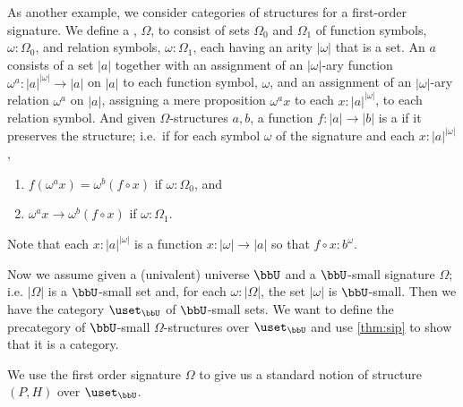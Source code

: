 As another example, we consider categories of structures for a first-order signature.
We define a ,
%
%
$\Omega$, to consist of sets $\Omega_0$ and $\Omega_1$ of function symbols, $\omega:\Omega_0$, and relation symbols, $\omega:\Omega_1$, each having an arity $|\omega|$ that is a set.
An 
%
%
$a$ consists of a set $|a|$ together with an assignment of an $|\omega|$-ary function $\omega^a:|a|^{|\omega|}\to |a|$ on $|a|$ to each function symbol, $\omega$, and an assignment of an $|\omega|$-ary relation $\omega^a$ on $|a|$, assigning a mere proposition $\omega^ax$ to each $x:|a|^{|\omega|}$, to each relation symbol.
And given $\Omega$-structures $a,b$, a function $f:|a|\to |b|$ is a 
%
%
if it preserves the structure; i.e.\ if for each symbol $\omega$ of the signature and each $x:|a|^{|\omega|}$,
\begin{enumerate}
\item $f(\omega^ax) = \omega^b(f\circ x)$ if $\omega:\Omega_0$, and
\item $\omega^ax\to\omega^b(f\circ x)$ if $\omega:\Omega_1$.
\end{enumerate}
Note that each $x:|a|^{|\omega|}$ is a function $x:|\omega|\to |a|$ so that $f\circ x : b^\omega$.

Now we assume given a (univalent) universe $\bbU$ and a $\bbU$-small signature $\Omega$; i.e. $|\Omega|$ is a $\bbU$-small set and, for each $\omega:|\Omega|$, the set $|\omega|$ is $\bbU$-small.
Then we have the category $\uset_\bbU$ of $\bbU$-small sets.  We want to define the precategory of $\bbU$-small $\Omega$-structures over $\uset_\bbU$ and use \cref{thm:sip} to show that it is a category.

We use the first order signature $\Omega$ to give us a standard notion of structure $(P,H)$ over $\uset_\bbU$.

